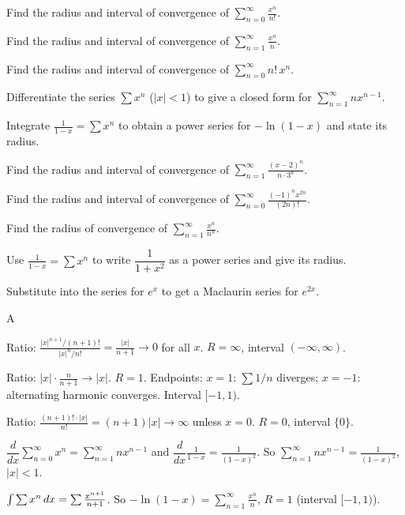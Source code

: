 \documentclass[11pt]{article}
\begin{document}
\begin{problems}
\item Find the radius and interval of convergence of $\displaystyle \sum_{n=0}^\infty \frac{x^n}{n!}$.
\item Find the radius and interval of convergence of $\displaystyle \sum_{n=1}^\infty \frac{x^n}{n}$.
\item Find the radius and interval of convergence of $\displaystyle \sum_{n=0}^\infty n! \, x^n$.
\item Differentiate the series $\sum x^n$ ($|x|<1$) to give a closed form for $\sum_{n=1}^\infty n x^{n-1}$.
\item Integrate $\tfrac{1}{1-x} = \sum x^n$ to obtain a power series for $-\ln(1-x)$ and state its radius.
\end{problems}

\vfill
\newpage
{}
\begin{problems}
\item Find the radius and interval of convergence of $\displaystyle \sum_{n=1}^\infty \frac{(x-2)^n}{n \cdot 3^n}$.
\item Find the radius and interval of convergence of $\displaystyle \sum_{n=0}^\infty \frac{(-1)^n x^{2n}}{(2n)!}$.
\item Find the radius of convergence of $\displaystyle \sum_{n=1}^\infty \frac{x^n}{n^n}$.
\item Use $\frac{1}{1-x}=\sum x^n$ to write $\dfrac{1}{1+x^2}$ as a power series and give its radius.
\item Substitute into the series for $e^x$ to get a Maclaurin series for $e^{2x}$.
\end{problems}

\vfill
\newpage
{}

\begin{answers}{A}
\item Ratio: $\tfrac{|x|^{n+1}/(n+1)!}{|x|^n/n!} = \tfrac{|x|}{n+1} \to 0$ for all $x$. $R = \infty$, interval $\boxed{(-\infty, \infty)}$.
\item Ratio: $|x| \cdot \tfrac{n}{n+1} \to |x|$. $R = 1$. Endpoints: $x = 1$: $\sum 1/n$ diverges; $x = -1$: alternating harmonic converges. Interval $\boxed{[-1, 1)}$.
\item Ratio: $\tfrac{(n+1)! \cdot |x|}{n!} = (n+1)|x| \to \infty$ unless $x = 0$. $R = 0$, interval $\boxed{\{0\}}$.
\item $\dfrac{d}{dx} \sum_{n=0}^\infty x^n = \sum_{n=1}^\infty n x^{n-1}$ and $\dfrac{d}{dx} \tfrac{1}{1-x} = \tfrac{1}{(1-x)^2}$. So $\boxed{\sum_{n=1}^\infty n x^{n-1} = \tfrac{1}{(1-x)^2}}$, $|x|<1$.
\item $\int \sum x^n \,dx = \sum \tfrac{x^{n+1}}{n+1}$. So $-\ln(1-x) = \displaystyle \sum_{n=1}^\infty \tfrac{x^n}{n}$, $R = 1$ (interval $[-1, 1)$).
\end{answers}
\end{document}
